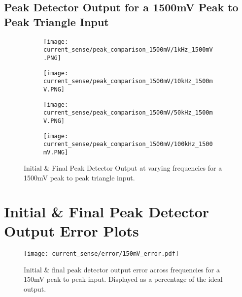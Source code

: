 \subsection*{Peak Detector Output for a 1500mV Peak to Peak Triangle Input}
\begin{figure}[H]
    
    \centering
    \begin{subfigure}{0.45\textwidth}
        \texttt{[image: current\_sense/peak\_comparison\_1500mV/1kHz\_1500mV.PNG]}
    \end{subfigure}
    \begin{subfigure}{0.45\textwidth}
        \texttt{[image: current\_sense/peak\_comparison\_1500mV/10kHz\_1500mV.PNG]}
    \end{subfigure}
    \begin{subfigure}{0.45\textwidth}
        \texttt{[image: current\_sense/peak\_comparison\_1500mV/50kHz\_1500mV.PNG]}
    \end{subfigure}
    \begin{subfigure}{0.45\textwidth}
        \texttt{[image: current\_sense/peak\_comparison\_1500mV/100kHz\_1500mV.PNG]}
    \end{subfigure}
    \caption{Initial \& Final Peak Detector Output at varying frequencies for a 1500mV peak to peak triangle input.}
\end{figure}
    

\section*{Initial \& Final Peak Detector Output Error Plots}\label{A:peak_detector_plots}

\begin{figure}[H]
    \begin{center}
        \texttt{[image: current\_sense/error/150mV\_error.pdf]}
        \caption{Initial \& final peak detector output error across frequencies for a 150mV peak to peak input. Displayed as a percentage of the ideal output.}
    \end{center}
\end{figure}

